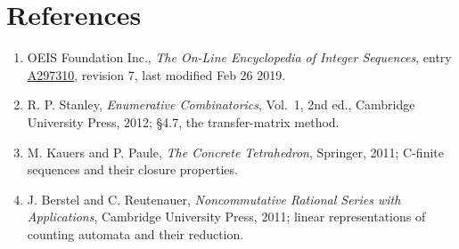 \documentclass[11pt]{article}
\theoremstyle{definition}
\begin{document}
\section{References}

\begin{enumerate}

\item OEIS Foundation Inc., \emph{The On-Line Encyclopedia of Integer Sequences}, entry \href{https://oeis.org/A297310}{A297310}, revision 7, last modified Feb 26 2019.

\item R. P. Stanley, \emph{Enumerative Combinatorics}, Vol.~1, 2nd ed., Cambridge University Press, 2012; \S4.7, the transfer-matrix method.

\item M. Kauers and P. Paule, \emph{The Concrete Tetrahedron}, Springer, 2011; C-finite sequences and their closure properties.

\item J. Berstel and C. Reutenauer, \emph{Noncommutative Rational Series with Applications}, Cambridge University Press, 2011; linear representations of counting automata and their reduction.

\end{enumerate}
\end{document}
